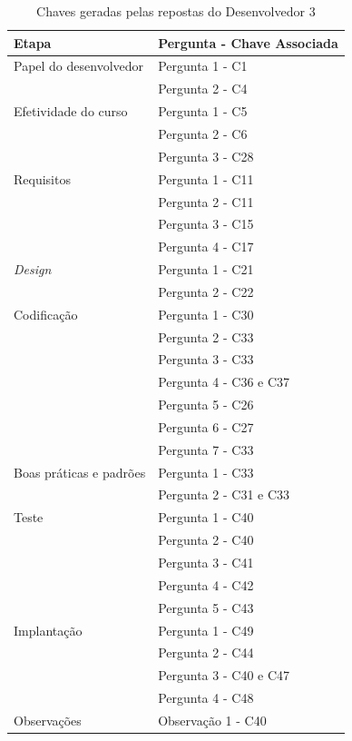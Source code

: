 \begin{table}[h]
	\centering
	\begin{tabular}{|m{4.8cm} | m{4.8cm} |}
		\hline
		\textbf{Etapa} & \textbf{Pergunta - Chave Associada} \\ \hline
		Papel do desenvolvedor & Pergunta 1 - C1 \\ \cline{2-2}
		& Pergunta 2 - C4 \\ \cline{2-2}
		\hline
		Efetividade do curso & Pergunta 1 - C5 \\ \cline{2-2}
		& Pergunta 2 - C6 \\ \cline{2-2}
		& Pergunta 3 - C28 \\ \cline{2-2}
		\hline
		Requisitos & Pergunta 1 - C11 \\ \cline{2-2}
		 & Pergunta 2 - C11 \\ \cline{2-2}
		& Pergunta 3 - C15 \\ \cline{2-2}
		& Pergunta 4 - C17 \\ \cline{2-2}
		\hline
		\textit{Design} & Pergunta 1 - C21 \\ \cline{2-2}
		& Pergunta 2 - C22 \\ \cline{2-2}
		\hline
		Codificação & Pergunta 1 - C30 \\ \cline{2-2}
		& Pergunta 2 - C33 \\ \cline{2-2}
		& Pergunta 3 - C33 \\ \cline{2-2}
		& Pergunta 4 - C36 e C37 \\ \cline{2-2}
		& Pergunta 5 - C26 \\ \cline{2-2}
		& Pergunta 6 - C27 \\ \cline{2-2}
		& Pergunta 7 - C33 \\ \cline{2-2} \hline
		Boas práticas e padrões & Pergunta 1 - C33 \\ \cline{2-2}
		& Pergunta 2 - C31 e C33 \\ \cline{2-2}
		\hline
		Teste & Pergunta 1 - C40 \\ \cline{2-2}
		& Pergunta 2 - C40 \\ \cline{2-2}
		& Pergunta 3 - C41 \\ \cline{2-2}
		& Pergunta 4 - C42 \\ \cline{2-2}
		& Pergunta 5 - C43 \\ \cline{2-2}
		\hline
		Implantação & Pergunta 1 - C49 \\ \cline{2-2}
		& Pergunta 2 - C44 \\ \cline{2-2}
		& Pergunta 3 - C40 e C47 \\ \cline{2-2}
		& Pergunta 4 - C48 \\ \cline{2-2}
		\hline
		Observações & Observação 1 - C40 \\ \hline
	\end{tabular}

	\caption{Chaves geradas pelas repostas do Desenvolvedor 3}
	\label{tab05}
\end{table}

